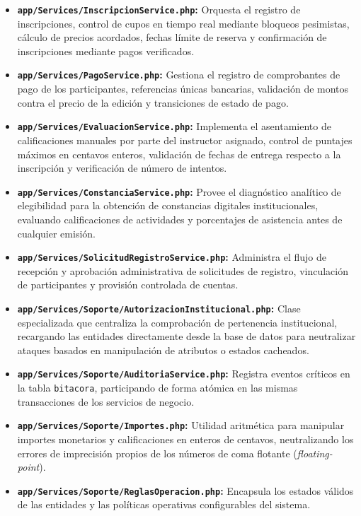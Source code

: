 \begin{itemize}
    \item \textbf{\texttt{app/Services/InscripcionService.php}:} Orquesta el registro de inscripciones, control de cupos en tiempo real mediante bloqueos pesimistas, cálculo de precios acordados, fechas límite de reserva y confirmación de inscripciones mediante pagos verificados.
    \item \textbf{\texttt{app/Services/PagoService.php}:} Gestiona el registro de comprobantes de pago de los participantes, referencias únicas bancarias, validación de montos contra el precio de la edición y transiciones de estado de pago.
    \item \textbf{\texttt{app/Services/EvaluacionService.php}:} Implementa el asentamiento de calificaciones manuales por parte del instructor asignado, control de puntajes máximos en centavos enteros, validación de fechas de entrega respecto a la inscripción y verificación de número de intentos.
    \item \textbf{\texttt{app/Services/ConstanciaService.php}:} Provee el diagnóstico analítico de elegibilidad para la obtención de constancias digitales institucionales, evaluando calificaciones de actividades y porcentajes de asistencia antes de cualquier emisión.
    \item \textbf{\texttt{app/Services/SolicitudRegistroService.php}:} Administra el flujo de recepción y aprobación administrativa de solicitudes de registro, vinculación de participantes y provisión controlada de cuentas.
    \item \textbf{\texttt{app/Services/Soporte/AutorizacionInstitucional.php}:} Clase especializada que centraliza la comprobación de pertenencia institucional, recargando las entidades directamente desde la base de datos para neutralizar ataques basados en manipulación de atributos o estados cacheados.
    \item \textbf{\texttt{app/Services/Soporte/AuditoriaService.php}:} Registra eventos críticos en la tabla \texttt{bitacora}, participando de forma atómica en las mismas transacciones de los servicios de negocio.
    \item \textbf{\texttt{app/Services/Soporte/Importes.php}:} Utilidad aritmética para manipular importes monetarios y calificaciones en enteros de centavos, neutralizando los errores de imprecisión propios de los números de coma flotante (\textit{floating-point}).
    \item \textbf{\texttt{app/Services/Soporte/ReglasOperacion.php}:} Encapsula los estados válidos de las entidades y las políticas operativas configurables del sistema.
\end{itemize}

